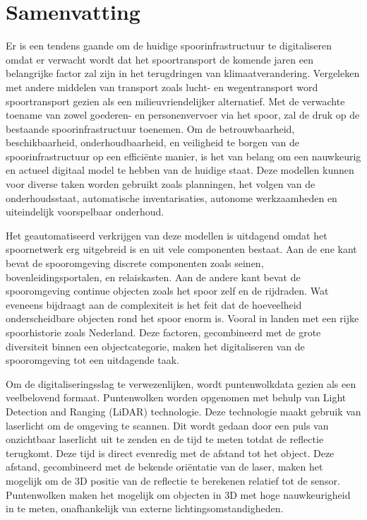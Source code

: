 \chapter{Samenvatting}
Er is een tendens gaande om de huidige spoorinfrastructuur te digitaliseren omdat er verwacht wordt dat het spoortransport de komende jaren een belangrijke factor zal zijn in het terugdringen van klimaatverandering. Vergeleken met andere middelen van transport zoals lucht- en wegentransport word spoortransport gezien als een milieuvriendelijker alternatief. Met de verwachte toename van zowel goederen- en personenvervoer via het spoor, zal de druk op de bestaande spoorinfrastructuur toenemen. Om de betrouwbaarheid, beschikbaarheid, onderhoudbaarheid, en veiligheid te borgen van de spoorinfrastructuur op een effici\"{e}nte manier, is het van belang om een nauwkeurig en actueel digitaal model te hebben van de huidige staat. Deze modellen kunnen voor diverse taken worden gebruikt zoals planningen, het volgen van de onderhoudsstaat, automatische inventarisaties, autonome werkzaamheden en uiteindelijk voorspelbaar onderhoud.

Het geautomatiseerd verkrijgen van deze modellen is uitdagend omdat het spoornetwerk erg uitgebreid is en uit vele componenten bestaat. Aan de ene kant bevat de spooromgeving discrete componenten zoals seinen, bovenleidingsportalen, en relaiskasten. Aan de andere kant bevat de spooromgeving continue objecten zoals het spoor zelf en de rijdraden. Wat eveneens bijdraagt aan de complexiteit is het feit dat de hoeveelheid onderscheidbare objecten rond het spoor enorm is. Vooral in landen met een rijke spoorhistorie zoals Nederland. Deze factoren, gecombineerd met de grote diversiteit binnen een objectcategorie, maken het digitaliseren van de spooromgeving tot een uitdagende taak.

Om de digitaliseringsslag te verwezenlijken, wordt puntenwolkdata gezien als een veelbelovend formaat. Puntenwolken worden opgenomen met behulp van Light Detection and Ranging (LiDAR) technologie. Deze technologie maakt gebruik van laserlicht om de omgeving te scannen. Dit wordt gedaan door een puls van onzichtbaar laserlicht uit te zenden en de tijd te meten totdat de reflectie terugkomt. Deze tijd is direct evenredig met de afstand tot het object. Deze afstand, gecombineerd met de bekende ori\"{e}ntatie van de laser, maken het mogelijk om de 3D positie van de reflectie te berekenen relatief tot de sensor. Puntenwolken maken het mogelijk om objecten in 3D met hoge nauwkeurigheid in te meten, onafhankelijk van externe lichtingsomstandigheden. 

